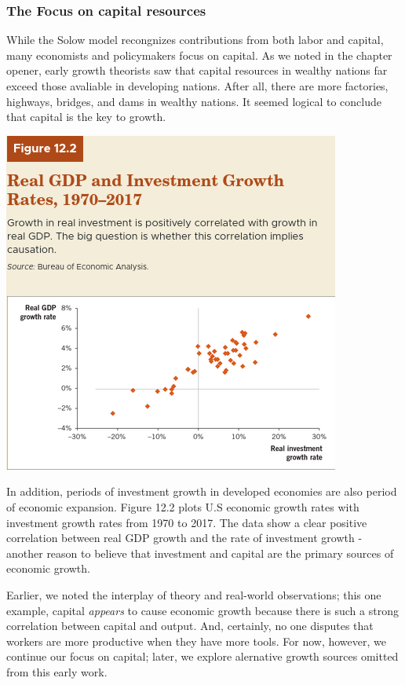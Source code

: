 \documentclass[11pt]{article} %
\begin{document}
\subsubsection*{The Focus on capital resources}
While the Solow model recongnizes contributions from both labor and capital, many economists and policymakers focus on capital. As we noted in the chapter opener, early growth theorists saw that capital resources in wealthy nations far exceed those avaliable in developing nations. After all, there are more factories, highways, bridges, and dams in wealthy nations. It seemed logical to conclude that capital is the key to growth.
\begin{center}
\includegraphics[scale=0.5]{Images/Figure13.2.png}
\end{center}
In addition, periods of investment growth in developed economies are also period of economic expansion. Figure 12.2 plots U.S economic growth rates with investment growth rates from 1970 to 2017. The data show a clear positive correlation between real GDP growth and the rate of investment growth - another reason to believe that investment and capital are the primary sources of economic growth.

Earlier, we noted the interplay of theory and real-world observations; this one example, capital \textit{appears} to cause economic growth because there is such a strong correlation between capital and output. And, certainly, no one disputes that workers are more productive when they have more tools. For now, however, we continue our focus on capital; later, we explore alernative growth sources omitted from this early work.
\end{document}
